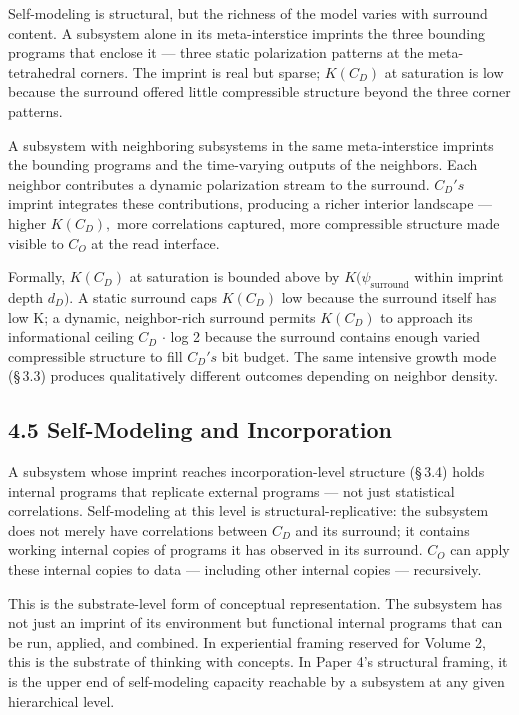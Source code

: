 \documentclass[11pt,oneside]{report}
\theoremstyle{definition}
\theoremstyle{remark}
\begin{document}
Self-modeling is structural, but the richness of the model varies with
surround content. A subsystem alone in its meta-interstice imprints the
three bounding programs that enclose it --- three static polarization
patterns at the meta-tetrahedral corners. The imprint is real but
sparse; \ensuremath{K(C_{D})} at saturation is low because the surround offered little
compressible structure beyond the three corner patterns.

A subsystem with neighboring subsystems in the same meta-interstice
imprints the bounding programs and the time-varying outputs of the
neighbors. Each neighbor contributes a dynamic polarization stream to
the surround. \ensuremath{C_{D}'s} imprint integrates these contributions, producing a
richer interior landscape --- higher \ensuremath{K(C_{D}),} more correlations
captured, more compressible structure made visible to \ensuremath{C_{O}} at the read
interface.

Formally, \ensuremath{K(C_{D})} at saturation is bounded above by \ensuremath{K(\psi_{\mathrm{surround}}} within
imprint depth \ensuremath{d_{D}).} A static surround caps \ensuremath{K(C_{D})} low because the
surround itself has low K; a dynamic, neighbor-rich surround permits
\ensuremath{K(C_{D})} to approach its informational ceiling \textbar \ensuremath{C_{D}}\textbar{} \ensuremath{\cdot}
log 2 because the surround contains enough varied compressible structure
to fill \ensuremath{C_{D}'s} bit budget. The same intensive growth mode (\S\,3.3)
produces qualitatively different outcomes depending on neighbor density.

\subsection*{4.5 Self-Modeling and Incorporation}

A subsystem whose imprint reaches incorporation-level structure (\S\,3.4)
holds internal programs that replicate external programs --- not just
statistical correlations. Self-modeling at this level is
structural-replicative: the subsystem does not merely have correlations
between \ensuremath{C_{D}} and its surround; it contains working internal copies of
programs it has observed in its surround. \ensuremath{C_{O}} can apply these internal
copies to data --- including other internal copies --- recursively.

This is the substrate-level form of conceptual representation. The
subsystem has not just an imprint of its environment but functional
internal programs that can be run, applied, and combined. In
experiential framing reserved for Volume 2, this is the substrate of
thinking with concepts. In Paper 4's structural framing, it is the upper
end of self-modeling capacity reachable by a subsystem at any given
hierarchical level.
\end{document}
